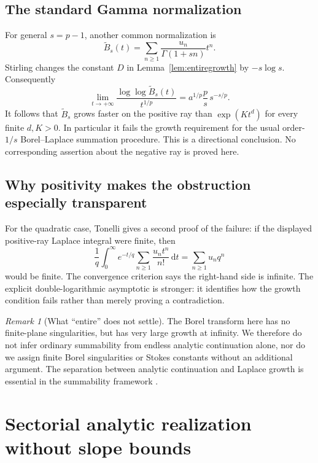 \documentclass[11pt,a4paper]{article}
\numberwithin{equation}{section}
\theoremstyle{definition}
\theoremstyle{remark}
\newtheorem{remark}[theorem]{Remark}
\newcommand{\dd}{\mathrm d}
\begin{document}
\subsection{The standard Gamma normalization}
For general $s=p-1$, another common normalization is
\[
 \widetilde B_s(t)=\sum_{n\ge1}\frac{u_n}{\Gamma(1+sn)}t^n.
\]
Stirling changes the constant $D$ in
Lemma~\ref{lem:entiregrowth} by $-s\log s$.  Consequently
\begin{equation}
 \lim_{t\to+\infty}
 \frac{\log\log\widetilde B_s(t)}{t^{1/p}}
 =a^{1/p}\frac p s\,s^{-s/p}.
 \label{eq:gammaborelgrowth}
\end{equation}
It follows that $\widetilde B_s$ grows faster on the positive ray than
$\exp(Kt^d)$ for every finite $d,K>0$.  In particular it fails the growth
requirement for the usual order-$1/s$ Borel--Laplace summation procedure.
This is a directional conclusion.  No corresponding assertion about the
negative ray is proved here.

\subsection{Why positivity makes the obstruction especially transparent}
For the quadratic case, Tonelli gives a second proof of the failure:
if the displayed positive-ray Laplace integral were finite, then
\[
 \frac1q\int_0^\infty e^{-t/q}
       \sum_{n\ge1}\frac{u_n t^n}{n!}\,\dd t
 =\sum_{n\ge1}u_nq^n
\]
would be finite.  The convergence criterion says the right-hand side is
infinite.  The explicit double-logarithmic asymptotic is stronger: it
identifies how the growth condition fails rather than merely proving a
contradiction.

\begin{remark}[What ``entire'' does not settle]
The Borel transform here has no finite-plane singularities, but has very
large growth at infinity.  We therefore do not infer ordinary summability
from endless analytic continuation alone, nor do we assign finite Borel
singularities or Stokes constants without an additional argument.  The
separation between analytic continuation and Laplace growth is essential
in the summability framework \cite{sauzin}.
\end{remark}

\section{Sectorial analytic realization without slope bounds}
\label{sec:sector}
\end{document}
